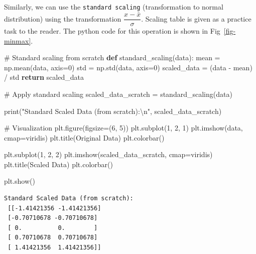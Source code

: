 \documentclass[
  letterpaper,
  DIV=11,
  numbers=noendperiod]{scrreprt}
\newenvironment{Shaded}{\begin{snugshade}}{\end{snugshade}}
\newcommand{\BuiltInTok}[1]{\textcolor[rgb]{0.00,0.23,0.31}{#1}}
\newcommand{\CharTok}[1]{\textcolor[rgb]{0.13,0.47,0.30}{#1}}
\newcommand{\CommentTok}[1]{\textcolor[rgb]{0.37,0.37,0.37}{#1}}
\newcommand{\ControlFlowTok}[1]{\textcolor[rgb]{0.00,0.23,0.31}{\textbf{#1}}}
\newcommand{\DecValTok}[1]{\textcolor[rgb]{0.68,0.00,0.00}{#1}}
\newcommand{\KeywordTok}[1]{\textcolor[rgb]{0.00,0.23,0.31}{\textbf{#1}}}
\newcommand{\NormalTok}[1]{\textcolor[rgb]{0.00,0.23,0.31}{#1}}
\newcommand{\OperatorTok}[1]{\textcolor[rgb]{0.37,0.37,0.37}{#1}}
\newcommand{\StringTok}[1]{\textcolor[rgb]{0.13,0.47,0.30}{#1}}
\theoremstyle{plain}
\theoremstyle{definition}
\theoremstyle{remark}
\begin{document}
Similarly, we can use the \texttt{standard\ scaling} (transformation to
normal distribution) using the transformation
\(\dfrac{x-\bar{x}}{\sigma}\). Scaling table is given as a practice task
to the reader. The python code for this operation is shown in
Fig~\ref{fig-minmax}.

\begin{Shaded}
\begin{Highlighting}[]
\CommentTok{\# Standard scaling from scratch}
\KeywordTok{def}\NormalTok{ standard\_scaling(data):}
\NormalTok{    mean }\OperatorTok{=}\NormalTok{ np.mean(data, axis}\OperatorTok{=}\DecValTok{0}\NormalTok{)}
\NormalTok{    std }\OperatorTok{=}\NormalTok{ np.std(data, axis}\OperatorTok{=}\DecValTok{0}\NormalTok{)}
\NormalTok{    scaled\_data }\OperatorTok{=}\NormalTok{ (data }\OperatorTok{{-}}\NormalTok{ mean) }\OperatorTok{/}\NormalTok{ std}
    \ControlFlowTok{return}\NormalTok{ scaled\_data}

\CommentTok{\# Apply standard scaling}
\NormalTok{scaled\_data\_scratch }\OperatorTok{=}\NormalTok{ standard\_scaling(data)}

\BuiltInTok{print}\NormalTok{(}\StringTok{"Standard Scaled Data (from scratch):}\CharTok{\textbackslash{}n}\StringTok{"}\NormalTok{, scaled\_data\_scratch)}

\CommentTok{\# Visualization}
\NormalTok{plt.figure(figsize}\OperatorTok{=}\NormalTok{(}\DecValTok{6}\NormalTok{, }\DecValTok{5}\NormalTok{))}
\NormalTok{plt.subplot(}\DecValTok{1}\NormalTok{, }\DecValTok{2}\NormalTok{, }\DecValTok{1}\NormalTok{)}
\NormalTok{plt.imshow(data, cmap}\OperatorTok{=}\StringTok{\textquotesingle{}viridis\textquotesingle{}}\NormalTok{)}
\NormalTok{plt.title(}\StringTok{\textquotesingle{}Original Data\textquotesingle{}}\NormalTok{)}
\NormalTok{plt.colorbar()}

\NormalTok{plt.subplot(}\DecValTok{1}\NormalTok{, }\DecValTok{2}\NormalTok{, }\DecValTok{2}\NormalTok{)}
\NormalTok{plt.imshow(scaled\_data\_scratch, cmap}\OperatorTok{=}\StringTok{\textquotesingle{}viridis\textquotesingle{}}\NormalTok{)}
\NormalTok{plt.title(}\StringTok{\textquotesingle{}Scaled Data\textquotesingle{}}\NormalTok{)}
\NormalTok{plt.colorbar()}

\NormalTok{plt.show()}
\end{Highlighting}
\end{Shaded}

\begin{verbatim}
Standard Scaled Data (from scratch):
 [[-1.41421356 -1.41421356]
 [-0.70710678 -0.70710678]
 [ 0.          0.        ]
 [ 0.70710678  0.70710678]
 [ 1.41421356  1.41421356]]
\end{verbatim}
\end{document}
